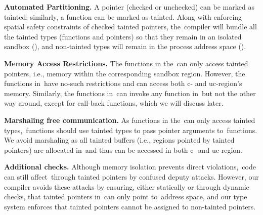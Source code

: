\noindent
\textbf{Automated Partitioning.} A pointer (checked or unchecked) can be marked as tainted; similarly, a function can be marked as tainted.
Along with enforcing spatial safety constraints of checked tainted pointers, the~\systemname compiler will bundle all the tainted types (functions and pointers) so that they remain in an isolated sandbox (\ucregion), and non-tainted types will remain in the process address space (\cregion).

\noindent
\textbf{Memory Access Restrictions.} The functions in the~\ucregion can only access tainted pointers, i.e., memory within the corresponding sandbox region.
However, the functions in~\cregion have no-such restrictions and can access both c- and uc-region's memory.
Similarly, the functions in~\cregion can invoke any function in~\ucregion but not the other way around, except for call-back functions, which we will discuss later.

\noindent
\textbf{Marshaling free communication.} As functions in the~\ucregion can only access tainted types,~\cregion functions should use tainted types to pass pointer arguments to~\ucregion functions. 
We avoid marshaling as all tainted buffers (i.e., regions pointed by tainted pointers) are allocated in~\ucregion and thus can be accessed in both c- and uc-region.

\noindent
\textbf{Additional checks.} Although memory isolation prevents direct violations,~\ucregion code can still affect~\cregion through tainted pointers by confused deputy attacks.
However, our compiler avoids these attacks by ensuring, either statically or through dynamic checks, that tainted pointers in~\cregion can only point to~\ucregion address space, and our type system enforces that tainted pointers cannot be assigned to non-tainted pointers.

